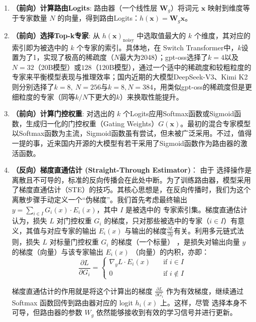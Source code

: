 \begin{enumerate}
    \item \textbf{（前向）计算路由Logits}: 路由器（一个线性层 $\mathbf{W}_g$）将词元 $\mathbf{x}$ 映射到维度等于专家数量 $N$ 的向量，得到路由Logits：$h(\mathbf{x}) = \mathbf{W}_g \mathbf{x}$。
    \item \textbf{（前向）选择Top-k专家}: 从 $h(\mathbf{x})_{\text{noisy}}$ 中选取值最大的 $k$ 个维度，其对应的索引即为被选中的 $k$ 个专家的索引。具体地，在 Switch Transformer\cite{Fedus2021SwitchTS}中，$k$设置为了1，实现了极高的稀疏度（$N$最大为2048）；gpt-oss\cite{openai2025gptoss}选择了$k = 4$以及$N = 32$（20B模型）或$128$（120B模型），通过一个适中的稀疏度和较粗粒度的专家来平衡模型表现与推理效率；国内近期的大模型DeepSeek-V3\cite{DeepSeekAI2024DeepSeekV3TR}、Kimi K2\cite{Bai2025KimiKO}则分别选择了$k = 8,\ N = 256$与$k=8, N=384$，用类似gpt-oss的稀疏度但是更细粒度的专家（同等$k/N$下更大的$k$）来换取性能提升。
    \item \textbf{（前向）计算门控权重}: 对选出的 $k$ 个Logits应用Softmax函数或Sigmoid函数，生成归一化的门控权重（Gating Weights）$G(\mathbf{x})$。最初的混合专家模型以Softmax函数为主流\cite{Shazeer2017OutrageouslyLN,Lepikhin2020GShardSG,Fedus2021SwitchTS}，Sigmoid函数虽有尝试\cite{Lewis2021BASELS,Dai2022StableMoESR}，但未被广泛采用。不过，值得一提的事，近来国内开源的大模型有若干采用了Sigmoid函数作为路由器的激活函数\cite{DeepSeekAI2024DeepSeekV3TR,Bai2025KimiKO,Zeng2025GLM45AR}。
    \item \textbf{（反向）梯度直通估计 (Straight-Through Estimator)}：
    由于  选择操作是离散且不可导的，标准的反向传播会在此处中断。为了训练路由器，模型采用了梯度直通估计（STE）\cite{Rosenblatt1958ThePA,Bengio2013EstimatingOP,Jang2016CategoricalRW,Liu2023BridgingDA}的技巧。其核心思想是，在反向传播时，我们为这个离散步骤手动定义一个“伪梯度”。我们首先考虑最终输出 $y = \sum_{i \in I} G_i(x) \cdot E_i(x)$，其中 $I$ 是被选中的  专家索引集。梯度直通估计认为，损失 $L$ 对门控权重 $G_i$ 的梯度，只对那些被选中的专家（$i \in I$）有意义，其值与对应专家的输出 $E_i(x)$ 与输出的梯度$\frac{\partial L}{\partial y}$有关。利用多元链式法则，损失 $L$ 对标量门控权重 $G_i$ 的梯度（一个标量） ，是损失对输出向量 $y$ 的梯度（向量）与该专家输出 $E_i(x)$ （向量）的内积，亦即：
    \begin{equation}
        \frac{\partial L}{\partial G_i} = 
    \begin{cases}
        \nabla_y L \cdot E_i(x) & \quad \text{if } i \in I \\
        0 & \quad \text{if } i \notin I
    \end{cases}
    \end{equation}
    
    梯度直通估计的作用就是将这个计算出的梯度 $\frac{\partial L}{\partial G_i}$ 作为有效梯度，继续通过 Softmax 函数回传到路由器对应的 logit $h_i(x)$ 上。这样，尽管  选择本身不可导，但路由器的参数 $W_g$ 依然能够接收到有效的学习信号并进行更新。
    
\end{enumerate}


